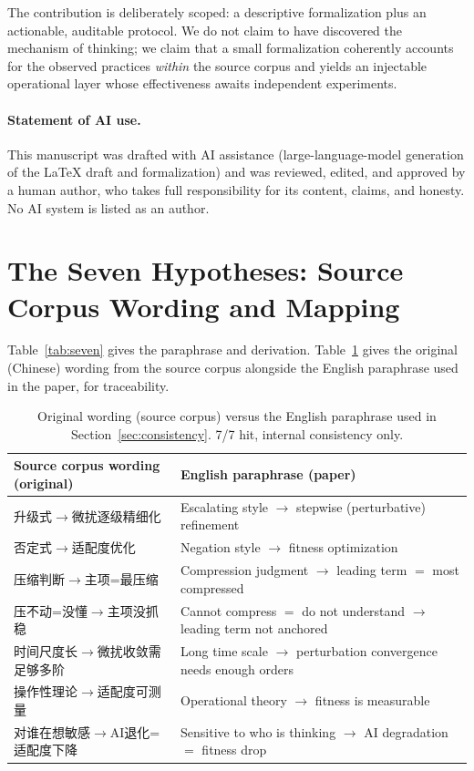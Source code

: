 \documentclass[11pt]{article}
\begin{document}
The contribution is deliberately scoped: a descriptive formalization plus an
actionable, auditable protocol. We do not claim to have discovered the mechanism
of thinking; we claim that a small formalization coherently accounts for the
observed practices \emph{within} the source corpus and yields an injectable
operational layer whose effectiveness awaits independent experiments.

\paragraph{Statement of AI use.}
This manuscript was drafted with AI assistance (large-language-model generation
of the LaTeX draft and formalization) and was reviewed, edited, and approved by
a human author, who takes full responsibility for its content, claims, and
honesty. No AI system is listed as an author.
\appendix
\section{The Seven Hypotheses: Source Corpus Wording and Mapping}
\label{app:hypotheses}

Table~\ref{tab:seven} gives the paraphrase and derivation. Table~\ref{tab:seven_raw}
gives the original (Chinese) wording from the source corpus alongside the
English paraphrase used in the paper, for traceability.

\begin{table}[htbp]
\centering
\small
\begin{tabular}{p{5.4cm}p{5.4cm}}
\toprule
Source corpus wording (original) & English paraphrase (paper) \\
\midrule
升级式$\to$微扰逐级精细化 & Escalating style $\to$ stepwise (perturbative) refinement \\
否定式$\to$适配度优化 & Negation style $\to$ fitness optimization \\
压缩判断$\to$主项=最压缩 & Compression judgment $\to$ leading term $=$ most compressed \\
压不动=没懂$\to$主项没抓稳 & Cannot compress $=$ do not understand $\to$ leading term not anchored \\
时间尺度长$\to$微扰收敛需足够多阶 & Long time scale $\to$ perturbation convergence needs enough orders \\
操作性理论$\to$适配度可测量 & Operational theory $\to$ fitness is measurable \\
对谁在想敏感$\to$AI退化=适配度下降 & Sensitive to who is thinking $\to$ AI degradation $=$ fitness drop \\
\bottomrule
\end{tabular}
\caption{Original wording (source corpus) versus the English paraphrase used in
Section~\ref{sec:consistency}. 7/7 hit, internal consistency only.}
\label{tab:seven_raw}
\end{table}
\end{document}
